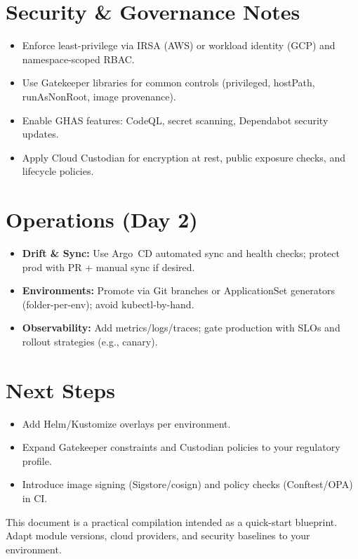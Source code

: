 \documentclass[11pt]{article}
\begin{document}
\section{Security \& Governance Notes}
\begin{itemize}[leftmargin=2em]
  \item Enforce least-privilege via IRSA (AWS) or workload identity (GCP) and namespace-scoped RBAC.
  \item Use Gatekeeper libraries for common controls (privileged, hostPath, runAsNonRoot, image provenance).
  \item Enable GHAS features: CodeQL, secret scanning, Dependabot security updates.
  \item Apply Cloud Custodian for encryption at rest, public exposure checks, and lifecycle policies.
\end{itemize}

\section{Operations (Day 2)}
\begin{itemize}[leftmargin=2em]
  \item \textbf{Drift \& Sync:} Use Argo~CD automated sync and health checks; protect prod with PR + manual sync if desired.
  \item \textbf{Environments:} Promote via Git branches or ApplicationSet generators (folder-per-env); avoid kubectl-by-hand.
  \item \textbf{Observability:} Add metrics/logs/traces; gate production with SLOs and rollout strategies (e.g., canary).
\end{itemize}

\section{Next Steps}
\begin{itemize}[leftmargin=2em]
  \item Add Helm/Kustomize overlays per environment.
  \item Expand Gatekeeper constraints and Custodian policies to your regulatory profile.
  \item Introduce image signing (Sigstore/cosign) and policy checks (Conftest/OPA) in CI.
\end{itemize}

\vfill
\noindent\footnotesize This document is a practical compilation intended as a quick-start blueprint. Adapt module versions, cloud providers, and security baselines to your environment.
\end{document}
